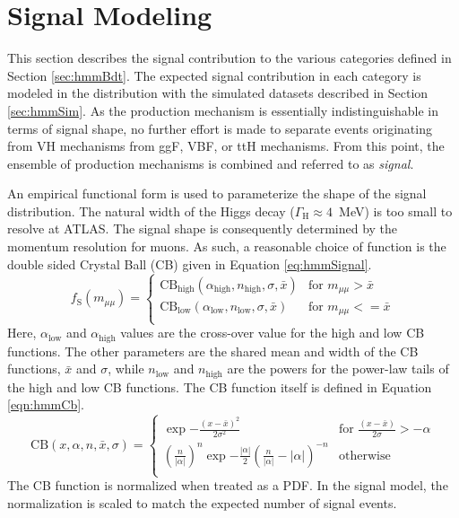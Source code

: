 \section{Signal Modeling}\label{sec:hmmSig}

This section describes the signal contribution to the various categories defined in Section \ref{sec:hmmBdt}.
The expected signal contribution in each category is modeled in the \muu distribution with the simulated datasets described in Section \ref{sec:hmmSim}.
As the production mechanism is essentially indistinguishable in terms of signal shape, no further effort is made to separate events originating from VH mechanisms from ggF, VBF, or ttH mechanisms.
From this point, the ensemble of production mechanisms is combined and referred to as \emph{signal}.

An empirical functional form is used to parameterize the shape of the signal distribution.
The natural width of the Higgs decay ($\Gamma_\text{H}\approx4$~MeV) is too small to resolve at ATLAS.
The signal shape is consequently determined by the momentum resolution for muons.
As such, a reasonable choice of function is the double sided Crystal Ball (CB) given in Equation \ref{eq:hmmSignal}.
\begin{equation}\label{eq:hmmSignal}
  f_\text{S}(m_{\mu\mu}) =
  \begin{cases}
  \text{CB}_\text{high}(\alpha_\text{high},n_\text{high},\sigma,\bar{x}) & \text{for }m_{\mu\mu}>\bar{x}\\
  \text{CB}_\text{low}(\alpha_\text{low},n_\text{low},\sigma,\bar{x}) & \text{for }m_{\mu\mu}<=\bar{x}\\
  \end{cases}
\end{equation}
Here, $\alpha_\text{low}$ and $\alpha_\text{high}$ values are the cross-over value for the high and low CB functions.
The other parameters are the shared mean and width of the CB functions, $\bar{x}$ and $\sigma$,
while $n_\text{low}$ and $n_\text{high}$ are the powers for the power-law tails of the high and low CB functions.
The CB function itself is defined in Equation \ref{eqn:hmmCb}.
\begin{equation}\label{eqn:hmmCb}
    \text{CB}(x,\alpha,n,\bar{x},\sigma) = 
    \begin{cases}
        \exp{-\frac{(x-\bar{x})^2}{2\sigma^2}} & \text{for }\frac{(x-\bar{x})}{2\sigma}>-\alpha \\
        \left(\frac{n}{|\alpha|}\right)^n \exp{-\frac{|\alpha|}{2}} \left(\frac{n}{|\alpha|}-|\alpha|\right)^{-n} & \text{otherwise}\\
    \end{cases}
\end{equation}
The CB function is normalized when treated as a PDF.
In the signal model, the normalization is scaled to match the expected number of signal events.

